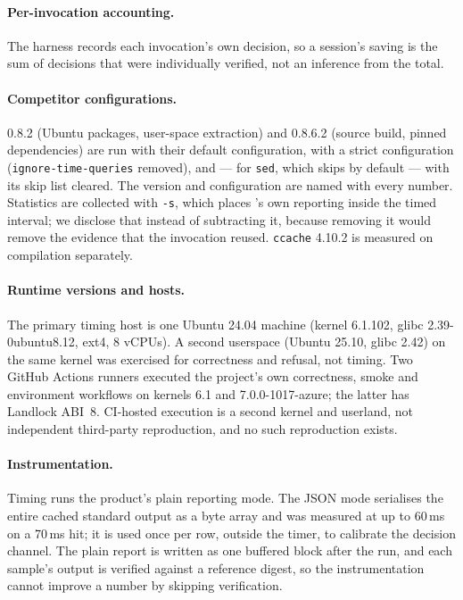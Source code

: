 \paragraph{Per-invocation accounting.}
The harness records each invocation's own decision, so a session's saving is the sum of decisions
that were individually verified, not an inference from the total.

\paragraph{Competitor configurations.}
\firebuild{} 0.8.2 (Ubuntu packages, user-space extraction) and 0.8.6.2 (source build, pinned
dependencies) are run with their default configuration, with a strict configuration
(\texttt{ignore-time-queries} removed), and --- for \texttt{sed}, which \firebuild{} skips by
default --- with its skip list cleared. The version and configuration are named with every number.
Statistics are collected with \texttt{-s}, which places \firebuild's own reporting inside the timed
interval; we disclose that instead of subtracting it, because removing it would remove the evidence
that the invocation reused. \texttt{ccache} 4.10.2 is measured on compilation separately.

\paragraph{Runtime versions and hosts.}
The primary timing host is one Ubuntu 24.04 machine (kernel 6.1.102, glibc 2.39-0ubuntu8.12,
ext4, 8 vCPUs). A second userspace (Ubuntu 25.10, glibc 2.42) on the same kernel was exercised for
correctness and refusal, not timing. Two GitHub Actions runners executed the project's own
correctness, smoke and environment workflows on kernels 6.1 and 7.0.0-1017-azure; the latter has
Landlock ABI~8. CI-hosted execution is a second kernel and userland, not independent third-party
reproduction, and no such reproduction exists.

\paragraph{Instrumentation.}
Timing runs the product's plain reporting mode. The JSON mode serialises the entire cached standard
output as a byte array and was measured at up to 60\,ms on a 70\,ms hit; it is used once per row,
outside the timer, to calibrate the decision channel. The plain report is written as one buffered
block after the run, and each sample's output is verified against a reference digest, so the
instrumentation cannot improve a number by skipping verification.

